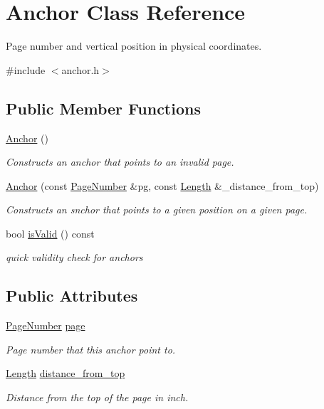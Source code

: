 \hypertarget{classAnchor}{\section{Anchor Class Reference}
\label{classAnchor}
}


Page number and vertical position in physical coordinates.  




{\ttfamily \#include $<$anchor.\+h$>$}

\subsection*{Public Member Functions}
\begin{DoxyCompactItemize}
\item 
\hyperlink{classAnchor_a5bf43f017bb50f8e6a4c8bb4f31bd001}{Anchor} ()
\begin{DoxyCompactList}\small\item\em Constructs an anchor that points to an invalid page. \end{DoxyCompactList}\item 
\hyperlink{classAnchor_ad152a54b313f8e2cd4ff87ce85fc78e5}{Anchor} (const \hyperlink{classPageNumber}{Page\+Number} \&pg, const \hyperlink{classLength}{Length} \&\+\_\+distance\+\_\+from\+\_\+top)
\begin{DoxyCompactList}\small\item\em Constructs an snchor that points to a given position on a given page. \end{DoxyCompactList}\item 
bool \hyperlink{classAnchor_a808ec5fc9d0075ca1c15cda24690277e}{is\+Valid} () const 
\begin{DoxyCompactList}\small\item\em quick validity check for anchors \end{DoxyCompactList}\end{DoxyCompactItemize}
\subsection*{Public Attributes}
\begin{DoxyCompactItemize}
\item 
\hyperlink{classPageNumber}{Page\+Number} \hyperlink{classAnchor_a6383150d7bcb2a7f0281274d17881aa2}{page}
\begin{DoxyCompactList}\small\item\em Page number that this anchor point to. \end{DoxyCompactList}\item 
\hyperlink{classLength}{Length} \hyperlink{classAnchor_a7bf0367a6cb313c7e2f7c7527928b635}{distance\+\_\+from\+\_\+top}
\begin{DoxyCompactList}\small\item\em Distance from the top of the page in inch. \end{DoxyCompactList}\end{DoxyCompactItemize}


